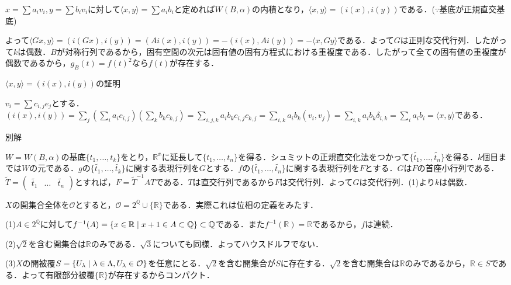 \documentclass[
		book,
		head_space=20mm,
		foot_space=20mm,
		gutter=10mm,
		line_length=190mm
]{jlreq}
\begin{document}
$x=\sum a_iv_i,y=\sum b_iv_i$に対して$\langle x,y\rangle=\sum a_ib_i$と定めれば$W(B,\alpha)$の内積となり，$\langle x,y \rangle=(i(x),i(y))$である．($\because $基底が正規直交基底)

よって$\langle Gx,y \rangle=(i(Gx),i(y))=(Ai(x),i(y))=-(i(x),Ai(y))=-\langle x,Gy \rangle$である．よって$G$は正則な交代行列．したがって$k$は偶数．$B$が対称行列であるから，固有空間の次元は固有値の固有方程式における重複度である．したがって全ての固有値の重複度が偶数であるから，$g_B(t)=f(t)^2$なら$f(t)$が存在する．
\begin{tcolorbox}[blanker,breakable,
    left=3mm,right=3mm,
    borderline vertical={1pt}{0pt}{black,dotted}]
    $\langle x,y \rangle=(i(x),i(y))$の証明

    $v_i=\sum c_{i,j}e_j$とする．
    $(i(x),i(y))=\sum_j (\sum_i a_ic_{i,j})(\sum_k b_kc_{k,j})=\sum_{i,j,k}a_ib_kc_{i,j}c_{k,j}=\sum_{i,k}a_ib_k(v_i,v_j)=\sum_{i,k}a_ib_k\delta_{i,k}=\sum_i a_ib_i=\langle x,y \rangle$である．
    \end{tcolorbox}
\begin{tcolorbox}[blanker,breakable,
    left=3mm,right=3mm,
    borderline vertical={1pt}{0pt}{black,dotted}]
    別解

    $W=W(B,\alpha)$の基底$\{t_1,\dots,t_k\}$をとり，$\mathbb{R^n}$に延長して$\{t_1,\dots,t_n\}$を得る．シュミットの正規直交化法をつかって$\{\tilde{t_1},\dots,\tilde{t_n}\}$を得る．$k$個目までは$W$の元である．$g$の$\{\tilde{t_1},\dots,\tilde{t_k}\}$に関する表現行列を$G$とする．$f$の$\{\tilde{t_1},\dots,\tilde{t_n}\}$に関する表現行列を$F$とする．$G$は$F$の首座小行列である．$\tilde {T}=\begin{pmatrix}
    \tilde{t_1}&\dots&\tilde{t_n}
    \end{pmatrix}$とすれば，$F=\tilde{T}^{-1}AT$である．$T$は直交行列であるから$F$は交代行列．よって$G$は交代行列．(1)より$k$は偶数．
\end{tcolorbox} 

$X$の開集合全体を$\mathcal{O}$とすると，$\mathcal{O}=2^\mathbb{Q}\cup \{\mathbb{R}\}$である．実際これは位相の定義をみたす．

(1)$A \in 2^\mathbb{Q}$に対して$f^{-1}(A)=\left\{ x \in \mathbb{R}\mathrel{}\middle|\mathrel{} x+1 \in A \subset \mathbb{Q}\right\}\subset \mathbb{Q}$である．また$f^{-1}(\mathbb{R})=\mathbb{R}$であるから，$f$は連続．

(2)$\sqrt{2}$を含む開集合は$\mathbb{R}$のみである．$\sqrt{3}$についても同様．よってハウスドルフでない．

(3)$X$の開被覆$S=\left\{ U_\lambda\mathrel{}\middle|\mathrel{} \lambda\in \Lambda,U_\lambda\in \mathcal{O}\right\}$を任意にとる．$\sqrt{2}$を含む開集合が$S$に存在する．$\sqrt{2}$を含む開集合は$\mathbb{R}$のみであるから，$\mathbb{R}\in S$である．よって有限部分被覆$\{ \mathbb{R}\}$が存在するからコンパクト．
\end{document}
